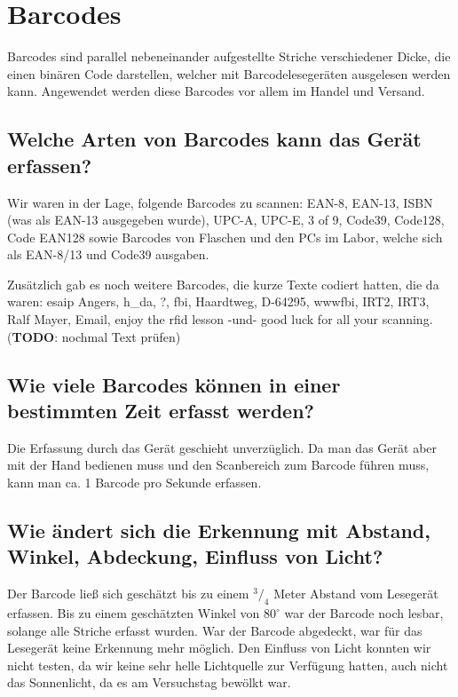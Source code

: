 \documentclass[a4paper,11pt,headsepline,footsepline,parskip=half]{scrartcl}
\begin{document}
\section{Barcodes}

Barcodes sind parallel nebeneinander aufgestellte Striche verschiedener Dicke, die einen binären Code darstellen,
welcher mit Barcodelesegeräten ausgelesen werden kann. Angewendet werden diese Barcodes vor allem im Handel und Versand.

\subsection{Welche Arten von Barcodes kann das Gerät erfassen?}

Wir waren in der Lage, folgende Barcodes zu scannen: EAN-8, EAN-13, ISBN (was als EAN-13 ausgegeben wurde),
UPC-A, UPC-E, 3 of 9, Code39, Code128, Code EAN128 sowie Barcodes von Flaschen und den PCs im Labor, welche
sich als EAN-8/13 und Code39 ausgaben.

Zusätzlich gab es noch weitere Barcodes, die kurze Texte codiert hatten, die da waren: esaip Angers, h\_da, ?, fbi, Haardtweg, D-64295,
wwwfbi, IRT2, IRT3, Ralf Mayer, Email, enjoy the rfid lesson -und- good luck for all your scanning. (\textbf{TODO}: nochmal Text prüfen)

\subsection{Wie viele Barcodes können in einer bestimmten Zeit erfasst werden?}

Die Erfassung durch das Gerät geschieht unverzüglich. Da man das Gerät aber mit der Hand bedienen muss und den
Scanbereich zum Barcode führen muss, kann man ca. 1 Barcode pro Sekunde erfassen.

\subsection{Wie ändert sich die Erkennung mit Abstand, Winkel, Abdeckung, Einfluss von Licht?}

Der Barcode ließ sich geschätzt bis zu einem $^3/_4$ Meter Abstand vom Lesegerät erfassen. Bis zu einem geschätzten
Winkel von $80^\circ$ war der Barcode noch lesbar, solange alle Striche erfasst wurden. War der Barcode abgedeckt, war
für das Lesegerät keine Erkennung mehr möglich. Den Einfluss von Licht konnten wir nicht testen, da wir keine
sehr helle Lichtquelle zur Verfügung hatten, auch nicht das Sonnenlicht, da es am Versuchstag bewölkt war.
\end{document}
